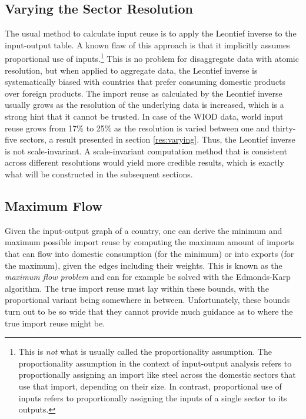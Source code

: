 \documentclass[english]{uzhpub}
\begin{document}
\subsection{Varying the Sector Resolution}
\label{Varying}
The usual method to calculate input reuse is to apply the Leontief inverse to the input-output table. A known flaw of this approach is that it implicitly assumes proportional use of inputs.\footnote{This is \emph{not} what is usually called the proportionality assumption. The proportionality assumption in the context of input-output analysis refers to proportionally assigning an import like steel across the domestic sectors that use that import, depending on their size. In contrast, proportional use of inputs refers to proportionally assigning the inputs of a single sector to its outputs.} This is no problem for disaggregate data with atomic resolution, but when applied to aggregate data, the Leontief inverse is systematically biased with countries that prefer consuming domestic products over foreign products. The import reuse as calculated by the Leontief inverse usually grows as the resolution of the underlying data is increased, which is a strong hint that it cannot be trusted. In case of the WIOD data, world input reuse grows from 17\% to 25\% as the resolution is varied between one and thirty-five sectors, a result presented in section \ref{res:varying}. Thus, the Leontief inverse is not scale-invariant. A scale-invariant computation method that is consistent across different resolutions would yield more credible results, which is exactly what will be constructed in the subsequent sections.

\subsection{Maximum Flow}
Given the input-output graph of a country, one can derive the minimum and maximum possible import reuse by computing the maximum amount of imports that can flow into domestic consumption (for the minimum) or into exports (for the maximum), given the edges including their weights. This is known as the \emph{maximum flow problem} and can for example be solved with the Edmonds-Karp algorithm. \citep{edmonds1972theoretical} The true import reuse must lay within these bounds, with the proportional variant being somewhere in between. Unfortunately, these bounds turn out to be so wide that they cannot provide much guidance as to where the true import reuse might be.
\end{document}
